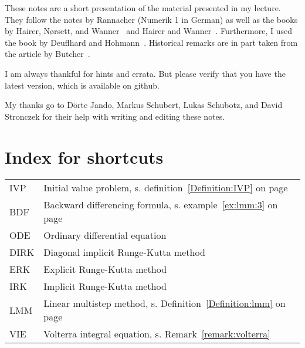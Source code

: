 These notes are a short presentation of the material presented in my
lecture. They follow the notes by Rannacher (Numerik 1 in German)
as well as the books by Hairer, Nørsett, and
Wanner~\cite{HairerNorsettWanner93} and Hairer and
Wanner~\cite{HairerWanner10}. Furthermore, I used the book by
Deuflhard and Hohmann~\cite{DeuflhardBornemann08}. Historical remarks
are in part taken from the article by Butcher~\cite{Butcher96}.

I am always thankful for hints and errata. But please verify that you
have the latest version, which is available on github.

My thanks go to Dörte Jando, Markus Schubert, Lukas Schubotz, and David Stronczek for their help
with writing and editing these notes.

\clearpage
\section*{Index for shortcuts}
\begin{tabular}{ll}
  IVP & Initial value problem, s. definition~\ref{Definition:IVP} on page~\pageref{Definition:IVP}\\
  BDF & Backward differencing formula, s. example~\ref{ex:lmm:3} on page~\pageref{ex:lmm:3}\\
  ODE & Ordinary differential equation\\
  DIRK & Diagonal implicit Runge-Kutta method\\
  ERK & Explicit Runge-Kutta method\\
  IRK & Implicit Runge-Kutta method\\
  LMM & Linear multistep method, s. Definition~\ref{Definition:lmm} on
  page~\pageref{ex:lmm:1}\\
  VIE & Volterra integral equation, s. Remark~\vref{remark:volterra}
\end{tabular}

